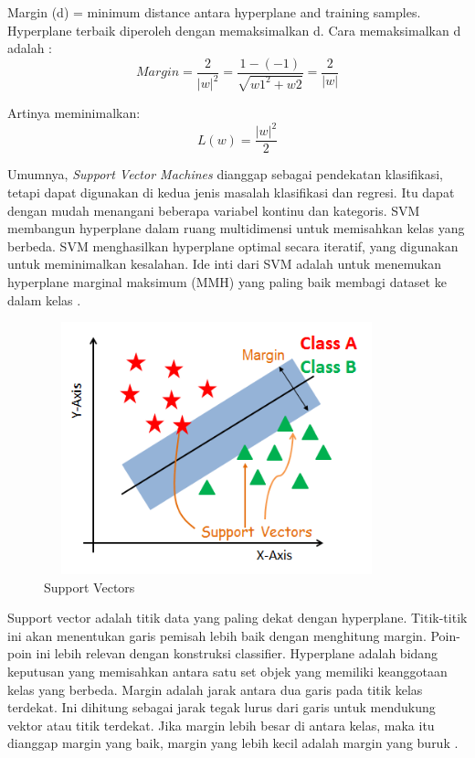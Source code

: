 \par Margin (d) = minimum distance antara hyperplane and training samples. Hyperplane terbaik diperoleh dengan memaksimalkan d. Cara memaksimalkan d adalah :
\begin{equation}
	Margin = \frac{2}{|w|^2} = \frac{1-(-1)}{\sqrt{w{1}^2+w{2}}} = \frac{2}{|w|}
\end{equation}

Artinya meminimalkan:
\begin{equation}
	L(w)=\frac{|w|^2}{2}
\end{equation}

\par Umumnya, \textit{Support Vector Machines} dianggap sebagai pendekatan klasifikasi, tetapi dapat digunakan di kedua jenis masalah klasifikasi dan regresi. Itu dapat dengan mudah menangani beberapa variabel kontinu dan kategoris. SVM membangun hyperplane dalam ruang multidimensi untuk memisahkan kelas yang berbeda. SVM menghasilkan hyperplane optimal secara iteratif, yang digunakan untuk meminimalkan kesalahan. Ide inti dari SVM adalah untuk menemukan hyperplane marginal maksimum (MMH) yang paling baik membagi dataset ke dalam kelas \citep{Braun2011}.

\begin{figure}[H]
	\centering
	\includegraphics[width=10cm, height=7.3cm]{gambar/index3_souoaz}
	\caption{Support Vectors}
	\label{index3_souoaz}
\end{figure}

\par Support vector adalah titik data yang paling dekat dengan hyperplane. Titik-titik ini akan menentukan garis pemisah lebih baik dengan menghitung margin. Poin-poin ini lebih relevan dengan konstruksi classifier. Hyperplane adalah bidang keputusan yang memisahkan antara satu set objek yang memiliki keanggotaan kelas yang berbeda. Margin adalah jarak antara dua garis pada titik kelas terdekat. Ini dihitung sebagai jarak tegak lurus dari garis untuk mendukung vektor atau titik terdekat. Jika margin lebih besar di antara kelas, maka itu dianggap margin yang baik, margin yang lebih kecil adalah margin yang buruk \citep{Campbell2010}.


